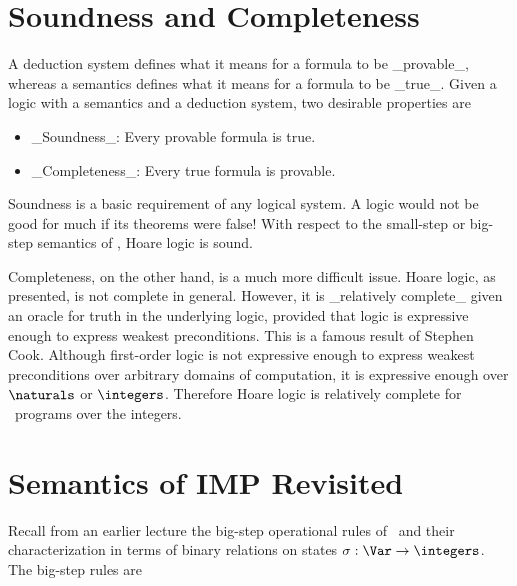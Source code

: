 \section{Soundness and Completeness}

A deduction system defines what it means for a formula to be _provable_, whereas a semantics defines what it means for a formula to be _true_. Given a logic with a semantics and a deduction system, two desirable properties are
\begin{itemize}
\item _Soundness_: Every provable formula is true.
\item _Completeness_: Every true formula is provable.
\end{itemize}

Soundness is a basic requirement of any logical system. A logic would not be good for much if its theorems were false! With respect to the small-step or big-step semantics of \IMP, Hoare logic is sound.

Completeness, on the other hand, is a much more difficult issue. Hoare logic, as presented, is not complete in general. However, it is _relatively complete_ given an oracle for truth in the underlying logic, provided that logic is expressive enough to express weakest preconditions. This is a famous result of Stephen Cook. Although first-order logic is not expressive enough to express weakest preconditions over arbitrary domains of computation, it is expressive enough over $\naturals$ or $\integers$. Therefore Hoare logic is relatively complete for \IMP\ programs over the integers.

\section{Semantics of IMP Revisited}

Recall from an earlier lecture the big-step operational rules of \IMP\ and their characterization in terms of binary relations on states $\sigma:\Var\to\integers$. The big-step rules are

